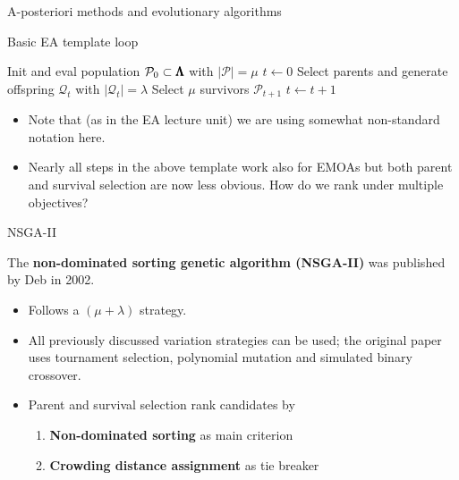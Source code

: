 \begin{frame}[allowframebreaks]{A-posteriori methods and evolutionary algorithms}
\framebreak

\begin{algorithm}[H]
  \begin{center}
  \caption{Basic EA template loop}
      \begin{algorithmic}[1]
          \STATE Init and eval population $\mathcal{P}_0 \subset \pmb{\Lambda}$ with $|\mathcal{P}| = \mu$ 
      \STATE $t \leftarrow 0$
      \REPEAT
        \STATE Select parents and generate offspring $\mathcal{Q}_t$ with $|\mathcal{Q}_t| = \lambda$
        \STATE Select $\mu$ survivors $\mathcal{P}_{t + 1}$ 
 		\STATE $t \leftarrow t + 1$
     \end{algorithmic}
    \end{center}
\end{algorithm}


\begin{itemize}
    \item Note that (as in the EA lecture unit) we are using somewhat non-standard notation here.
    \item Nearly all steps in the above template work also for EMOAs but both parent and survival 
      selection are now less obvious. How do we rank under multiple objectives?
\end{itemize}
\end{frame}


\begin{frame}{NSGA-II}

The \textbf{non-dominated sorting genetic algorithm (NSGA-II)} was published by Deb in 2002.

\begin{itemize}
\item Follows a $(\mu + \lambda)$ strategy.
\item All previously discussed variation strategies can be used; 
    the original paper uses tournament selection, polynomial mutation and simulated binary crossover.
\item Parent and survival selection rank candidates by 
\begin{enumerate}
\item \textbf{Non-dominated sorting} as main criterion
\item \textbf{Crowding distance assignment} as tie breaker
\end{enumerate}
\end{itemize}

\end{frame}

